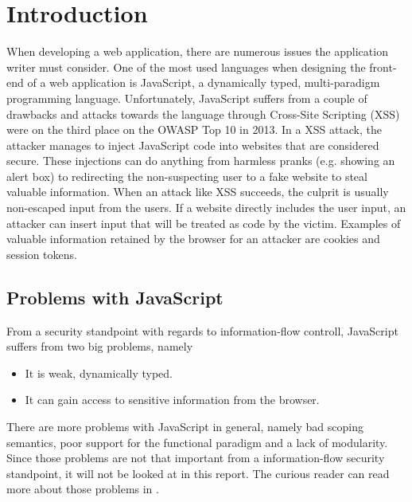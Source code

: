 \section{Introduction}
\label{chapter:intro}
When developing a web application, there are numerous issues the application writer must consider. One of the most used languages when designing the front-end of a web application is JavaScript\cite{javascript_popularity}, a dynamically typed, multi-paradigm programming language.\cite{javascript_info} Unfortunately, JavaScript suffers from a couple of drawbacks and attacks towards the language through Cross-Site Scripting (XSS) were on the third place on the OWASP Top 10 in 2013.\cite{owasp_xss_rank} In a XSS attack, the attacker manages to inject JavaScript code into websites that are considered secure.\cite{owasp_xss, excess_xss} These injections can do anything from harmless pranks (e.g. showing an alert box) to redirecting the non-suspecting user to a fake website to steal valuable information. When an attack like XSS succeeds, the culprit is usually non-escaped input from the users. If a website directly includes the user input, an attacker can insert input that will be treated as code by the victim.\cite{excess_xss} Examples of valuable information retained by the browser for an attacker are cookies and session tokens.
\subsection{Problems with JavaScript}
From a security standpoint with regards to information-flow controll, JavaScript suffers from two big problems, namely
\begin{itemize}
  \item It is weak, dynamically typed.
  \item It can gain access to sensitive information from the browser.
\end{itemize}
There are more problems with JavaScript in general, namely bad scoping semantics, poor support for the functional paradigm and a lack of modularity. Since those problems are not that important from a information-flow security standpoint, it will not be looked at in this report. The curious reader can read more about those problems in \cite{haste-lang}.

